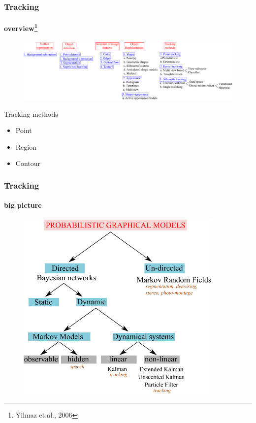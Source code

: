 \begin{frame}[plain]
\frametitle{Tracking}
\framesubtitle{overview\tiny{\footnote {Yilmaz et.al., 2006}}}
\logoCSIPCPL\mypagenum
	\begin{changemargin}{-1.3in}{0in}
		\begin{figure}
			\includegraphics[width=1.3\textwidth]{figs/TRK_overview.pdf}
		\end{figure}	
	\end{changemargin}
	\begin{block}{Tracking methods}
		\begin{itemize}
			\item Point
			\item Region
			\item Contour
		\end{itemize}
	\end{block}
\end{frame}



\begin{frame}
\frametitle{Tracking}
\framesubtitle{big picture}
\logoCSIPCPL\mypagenum
	\begin{figure}
		\includegraphics[width=0.9\textwidth]{figs/PRML_PGM_overview.pdf}
	\end{figure}
\end{frame}





